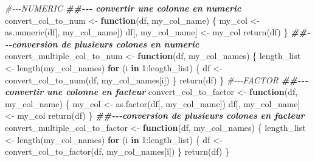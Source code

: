 \documentclass[
  12pt,
  american,
  a4paper,
  extrafontsizes,onecolumn,openright
  ]{memoir}
\newenvironment{Shaded}{\begin{snugshade}}{\end{snugshade}}
\newcommand{\CommentTok}[1]{\textcolor[rgb]{0.56,0.35,0.01}{\textit{#1}}}
\newcommand{\ControlFlowTok}[1]{\textcolor[rgb]{0.13,0.29,0.53}{\textbf{#1}}}
\newcommand{\DecValTok}[1]{\textcolor[rgb]{0.00,0.00,0.81}{#1}}
\newcommand{\DocumentationTok}[1]{\textcolor[rgb]{0.56,0.35,0.01}{\textbf{\textit{#1}}}}
\newcommand{\FunctionTok}[1]{\textcolor[rgb]{0.00,0.00,0.00}{#1}}
\newcommand{\NormalTok}[1]{#1}
\newcommand{\OtherTok}[1]{\textcolor[rgb]{0.56,0.35,0.01}{#1}}
\newcommand{\SpecialCharTok}[1]{\textcolor[rgb]{0.00,0.00,0.00}{#1}}
\begin{document}
\begin{Shaded}
\begin{Highlighting}[]
\CommentTok{\#{-}{-}{-}NUMERIC}
\DocumentationTok{\#\#{-}{-}{-} convertir une colonne en numeric}
\NormalTok{convert\_col\_to\_num }\OtherTok{\textless{}{-}} \ControlFlowTok{function}\NormalTok{(df, my\_col\_name) \{}
\NormalTok{    my\_col }\OtherTok{\textless{}{-}} \FunctionTok{as.numeric}\NormalTok{(df[, my\_col\_name])}
\NormalTok{    df[, my\_col\_name] }\OtherTok{\textless{}{-}}\NormalTok{ my\_col}
    \FunctionTok{return}\NormalTok{(df)}
\NormalTok{\}}
\DocumentationTok{\#\#{-}{-}{-}conversion de plusieurs colones en numeric}
\NormalTok{convert\_multiple\_col\_to\_num }\OtherTok{\textless{}{-}} \ControlFlowTok{function}\NormalTok{(df, my\_col\_names) \{}
\NormalTok{    length\_list }\OtherTok{\textless{}{-}} \FunctionTok{length}\NormalTok{(my\_col\_names)}
    \ControlFlowTok{for}\NormalTok{ (i }\ControlFlowTok{in} \DecValTok{1}\SpecialCharTok{:}\NormalTok{length\_list) \{}
\NormalTok{        df }\OtherTok{\textless{}{-}} \FunctionTok{convert\_col\_to\_num}\NormalTok{(df, my\_col\_names[i])}
\NormalTok{    \}}
    \FunctionTok{return}\NormalTok{(df)}
\NormalTok{\}}
\CommentTok{\#{-}{-}{-}FACTOR}
\DocumentationTok{\#\#{-}{-}{-} convertir une colonne en facteur}
\NormalTok{convert\_col\_to\_factor }\OtherTok{\textless{}{-}} \ControlFlowTok{function}\NormalTok{(df, my\_col\_name) \{}
\NormalTok{    my\_col }\OtherTok{\textless{}{-}} \FunctionTok{as.factor}\NormalTok{(df[, my\_col\_name])}
\NormalTok{    df[, my\_col\_name] }\OtherTok{\textless{}{-}}\NormalTok{ my\_col}
    \FunctionTok{return}\NormalTok{(df)}
\NormalTok{\}}
\DocumentationTok{\#\#{-}{-}{-}conversion de plusieurs colones en facteur}
\NormalTok{convert\_multiple\_col\_to\_factor }\OtherTok{\textless{}{-}} \ControlFlowTok{function}\NormalTok{(df, my\_col\_names) \{}
\NormalTok{    length\_list }\OtherTok{\textless{}{-}} \FunctionTok{length}\NormalTok{(my\_col\_names)}
    \ControlFlowTok{for}\NormalTok{ (i }\ControlFlowTok{in} \DecValTok{1}\SpecialCharTok{:}\NormalTok{length\_list) \{}
\NormalTok{        df }\OtherTok{\textless{}{-}} \FunctionTok{convert\_col\_to\_factor}\NormalTok{(df, my\_col\_names[i])}
\NormalTok{    \}}
    \FunctionTok{return}\NormalTok{(df)}
\NormalTok{\}}
\end{Highlighting}
\end{Shaded}

\normalsize

\scriptsize
\end{document}
